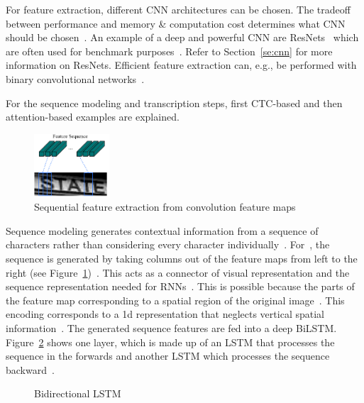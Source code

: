 For feature extraction, different \ac{CNN} architectures can be chosen.
The tradeoff between performance and memory \& computation cost determines what \ac{CNN} should be
chosen~\citep{chen_text_2021}.
An example of a deep and powerful \ac{CNN} are ResNets~\citep{he_deep_2015} which are often used
for benchmark purposes~\citep{chen_text_2021,long_scene_2021}.
Refer to Section~\ref{se:cnn} for more information on ResNets.
Efficient feature extraction can, e.g., be performed with binary convolutional
networks~\citep{liu_squeezedtext_2018}.

For the sequence modeling and transcription steps, first \ac{CTC}-based
and then attention-based examples are explained.
\begin{figure}[b]
    \centering
    \includegraphics[width=0.25\textwidth]{img/STR-encdec-sequence-feat.png}
    \caption[Sequential feature extraction from convolution feature maps]{%
        Sequential feature extraction from convolution feature
        maps~\citep{shi_end--end_2017}\label{fig:STR-CTC-seq-feat}
    }
\end{figure}
Sequence modeling generates contextual information from a sequence of characters rather
than considering every character individually~\citep{chen_text_2021}.
For~\cite{shi_end--end_2017}, the sequence is generated by taking columns out of the feature maps
from left to the right (see Figure~\ref{fig:STR-CTC-seq-feat})~\citep{shi_end--end_2017}.
This acts as a connector of visual representation and the sequence representation
needed for \acp{RNN}~\citep{chen_text_2021}.
This is possible because the parts of the feature map corresponding to a spatial region of the
original image~\citep{shi_end--end_2017,goodfellow_deep_2016}.
This encoding corresponds to a 1d representation that neglects vertical spatial
information~\citep{cong_comparative_2019}.
The generated sequence features are fed into a deep \ac{BiLSTM}.
Figure~\ref{fig:bilstm} shows one layer, which is made up of an \ac{LSTM} that processes the
sequence in the forwards and another \ac{LSTM} which processes the sequence
backward~\citep{shi_end--end_2017}.
\begin{figure}[ht]
    \centering
    \caption[Bidirectional LSTM]{%
        Bidirectional LSTM~\citep{goodfellow_deep_2016}\label{fig:bilstm}
    }
\end{figure}
